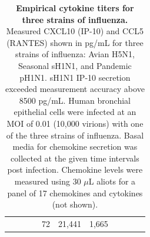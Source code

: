 \documentclass[preprint,10pt,authoryear]{elsarticle}
\begin{document}
\begin{table}[!ht]
\begin{center}
\begin{tabular}{| r r r | c | r r r | c | r r r |}
  & & & & 72 & 21,441 & 1,665 &  &  &  &  \\
    \cline{1-3} \cline{5-7} \cline{9-11}
\end{tabular}
\caption{\textbf{Empirical cytokine titers for three strains of influenza.}  Measured CXCL10 (IP-10) and CCL5 (RANTES) shown in pg/mL for three strains of influenza: Avian H5N1, Seasonal sH1N1, and Pandemic pH1N1.  sH1N1 IP-10 secretion exceeded measurement accuracy above 8500 pg/mL.  Human bronchial epithelial cells were infected at an MOI of 0.01 (10,000 virions) with one of the three strains of influenza.  Basal media for chemokine secretion was collected at the given time intervals post infection.  Chemokine levels were measured using 30 $\mu$L aliots for a panel of 17 chemokines and cytokines (not shown).}
\label{tab:data}
\end{center}
\end{table}
\end{document}
